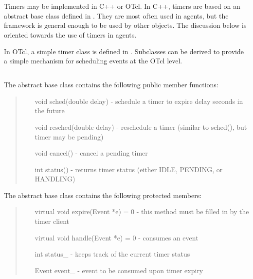 %
%
%
\chapter{}

Timers may be implemented in C++ or OTcl.  In C++, timers are based on an 
abstract base class defined in .  They are most often 
used in agents, but the 
framework is general enough to be used by other objects.  The discussion
below is oriented towards the use of timers in agents.

In OTcl, a simple timer class is defined in .  
Subclasses can be derived to provide a simple mechanism for scheduling events 
at the OTcl level.

\section{}

The abstract base class  contains the following public member functions:
\begin{tt}
\begin{quote}
\begin{itemize}
\item[void sched(double delay)] - schedule a timer to expire delay seconds in the future
\item[void resched(double delay)] - reschedule a timer (similar to sched(), but
timer may be pending)
\item[void cancel()] - cancel a pending timer
\item[int status()] - returns timer status (either IDLE, PENDING, or HANDLING)
\end{itemize}
\end{quote}
\end{tt}

The abstract base class  contains the following protected members:
\begin{tt}
\begin{quote}
\begin{itemize}
\item[virtual void expire(Event *e) = 0] - this method must be filled in by the timer client
\item[virtual void handle(Event *e) = 0] - consumes an event 
\item[int status\_] - keeps track of the current timer status
\item[Event event\_] - event to be consumed upon timer expiry 
\end{itemize}
\end{quote}
\end{tt}


